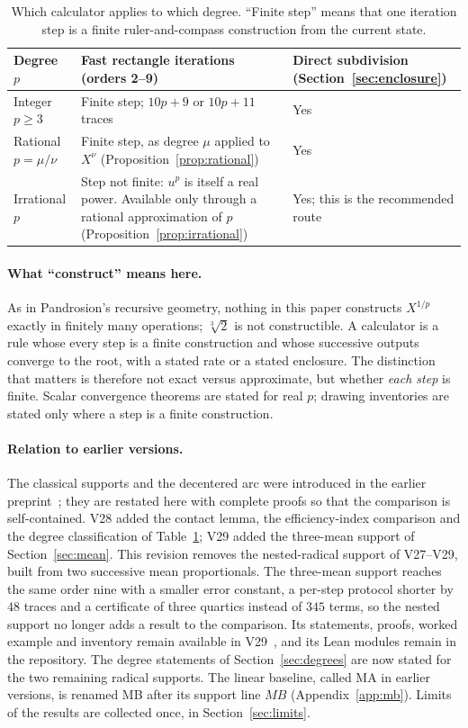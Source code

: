 \documentclass[10pt,a4paper]{article}
\theoremstyle{plain}
\theoremstyle{remark}
\numberwithin{equation}{section}
\begin{document}
\begin{table}[h]
\centering\small
\caption{Which calculator applies to which degree. ``Finite step'' means that one iteration step is a
finite ruler-and-compass construction from the current state.}\label{tab:degrees}
\begin{tabularx}{\linewidth}{@{}lXX@{}}
\toprule
Degree $p$ & Fast rectangle iterations (orders 2--9) & Direct subdivision (Section~\ref{sec:enclosure})\\
\midrule
Integer $p\ge 3$ & Finite step; $10p+9$ or $10p+11$ traces & Yes\\
Rational $p=\mu/\nu$ & Finite step, as degree $\mu$ applied to $X^{\nu}$ (Proposition~\ref{prop:rational}) & Yes\\
Irrational $p$ & Step not finite: $u^{p}$ is itself a real power. Available only through a rational
approximation of $p$ (Proposition~\ref{prop:irrational}) & Yes; this is the recommended route\\
\bottomrule
\end{tabularx}
\end{table}

\paragraph{What ``construct'' means here.}
As in Pandrosion's recursive geometry, nothing in this paper constructs $X^{1/p}$ exactly in finitely
many operations; $\sqrt[3]{2}$ is not constructible. A calculator is a rule whose every step is a finite
construction and whose successive outputs converge to the root, with a stated rate or a stated
enclosure. The distinction that matters is therefore not exact versus approximate, but whether
\emph{each step} is finite. Scalar convergence theorems are stated for real $p$; drawing inventories are
stated only where a step is a finite construction.

\paragraph{Relation to earlier versions.}
The classical supports and the decentered arc were introduced in the earlier preprint~\cite{v20}; they
are restated here with complete proofs so that the comparison is self-contained. V28 added the contact
lemma, the efficiency-index comparison and the degree classification of Table~\ref{tab:degrees}; V29
added the three-mean support of Section~\ref{sec:mean}. This revision removes the nested-radical support
of V27--V29, built from two successive mean proportionals. The three-mean support reaches the same order
nine with a smaller error constant, a per-step protocol shorter by $48$ traces and a certificate of three
quartics instead of $345$ terms, so the nested support no longer adds a result to the comparison. Its
statements, proofs, worked example and inventory remain available in V29~\cite{v29}, and its Lean modules
remain in the repository. The degree statements of Section~\ref{sec:degrees} are now stated for the two
remaining radical supports. The linear baseline, called MA in earlier versions, is renamed MB after its
support line $MB$ (Appendix~\ref{app:mb}). Limits of the results are collected once, in
Section~\ref{sec:limits}.
\end{document}
